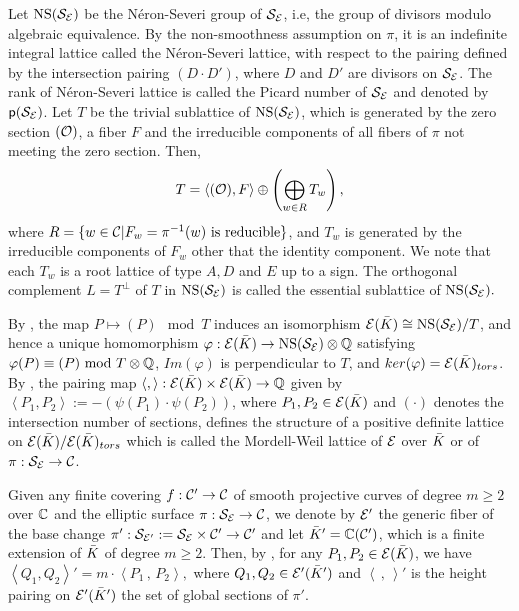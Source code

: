 \documentclass[11pt]{amsart}
\begin{document}
Let ${\rm NS} ({\mathcal S}_{\mathcal E})$ be the {\sf N\'{e}ron-Severi group} of ${\mathcal S}_{\mathcal E}$, i.e, 
the group of divisors modulo algebraic equivalence.
By the non-smoothness assumption on $\pi$,  it is an  indefinite integral lattice called the  {\sf N\'{e}ron-Severi lattice},
with  respect to the  pairing defined by the intersection pairing $(D\cdot D')$, where $D$ and $D'$ are divisors on ${\mathcal S}_{\mathcal E}$.
The rank  of N\'{e}ron-Severi lattice is called the {\sf Picard number} of ${\mathcal S}_{\mathcal E}$ and denoted 
by ${\sf p}({\mathcal S}_{\mathcal E})$.
Let $T$ be the {\sf trivial sublattice} of  ${\rm NS} ({\mathcal S}_{\mathcal E})$, which is  generated by the zero section $({\mathcal O})$,  a fiber $F$ and
the irreducible components of all  fibers of $\pi$ not meeting the zero section. Then, 
$$T= \left\langle ({\mathcal O}), F\right\rangle \oplus \left( \bigoplus_{w\in R} T_w \right),$$
where $R=\{ w\in {\mathcal C} | F_w=\pi^{-1}(w) \ \text{is reducible}\}$, and $T_w$ is generated by the irreducible components of $F_w$
other that  the identity component. We note that each $T_w$ is a root lattice of type $A, D$ and $E$ up to a sign.
The orthogonal complement $L=T^\perp$ of $T$ in ${\rm NS} ({\mathcal S}_{\mathcal E})$   is called the {\sf essential sublattice}   of  ${\rm NS} ({\mathcal S}_{\mathcal E}).$

By \cite[Theorem 1.3]{Shioda1990a}, the map $P \mapsto (P)  \mod  T$ induces an isomorphism ${\mathcal E}({{\bar K}}) \cong {\rm NS} ({\mathcal S}_{\mathcal E})/T$, and hence 
a unique homomorphism $\varphi: {\mathcal E}({{\bar K}}) \rightarrow {\rm NS} ({\mathcal S}_{\mathcal E}) \otimes {\mathbb Q}$ satisfying 
$\varphi(P) \equiv (P) \mbox{ mod }  T\otimes {\mathbb Q}$, $Im(\varphi)$ is perpendicular to $T$, and 
$ker(\varphi)= {\mathcal E}({{\bar K}})_{tors}$. By \cite[Theorem 8.4]{Shioda1990a},  the pairing map 
$\left\langle ,  \right\rangle : {\mathcal E}({{\bar K}}) \times {\mathcal E}({{\bar K}}) \rightarrow {\mathbb Q}$ given by 
$\left\langle P_1, P_2\right\rangle := - \left(\psi(P_1)\cdot \psi(P_2) \right)$,
where $P_1, P_2 \in {\mathcal E}({{\bar K}})$ and $(\cdot )$ denotes the intersection number of sections, 
defines the structure of a positive definite lattice on ${\mathcal E}({{\bar K}})/{\mathcal E}({{\bar K}})_{tors}$ which is called the {\sf Mordell-Weil lattice } of
${\mathcal E}$ over ${{\bar K}}$ or of  $\pi: {\mathcal S}_{\mathcal E} \rightarrow {\mathcal C}$.  

Given any finite covering $f : {\mathcal C}' \rightarrow {\mathcal C}$ of smooth projective curves of degree $m\geq 2$ over ${\mathbb C}$ and the elliptic surface   $\pi: {\mathcal S}_{\mathcal E} \rightarrow {\mathcal C}$, we denote by  ${\mathcal E}'$ the generic fiber of the  base change $\pi': {\mathcal S}_{{\mathcal E}'}:={\mathcal S}_{\mathcal E} \times {\mathcal C}' \rightarrow {\mathcal C}'$ and let ${{\bar K}}'={\mathbb C}({\mathcal C}')$, which is a  finite extension of ${{\bar K}}$ of degree $m\geq 2$. Then, 
by \cite[Proposition 8.12]{Shioda1990a}, for any
$P_1, P_2 \in {\mathcal E}({{\bar K}})$, we have 
$\left\langle Q_1 , Q_2\right\rangle' =m \cdot \left\langle P_1\, ,\, P_2\right\rangle,$
where $Q_1 , Q_2 \in {\mathcal E}'({{\bar K}}')$  and 
$\left\langle \, ,\,\right\rangle'$ is the height pairing on  ${\mathcal E}'({{\bar K}}')$ the set of global sections of $\pi'.$
\end{document}
